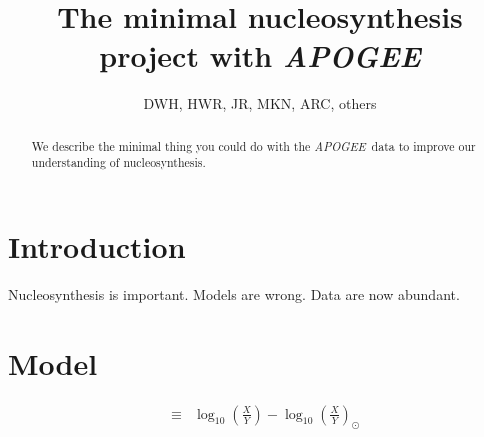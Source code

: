 \documentclass[12pt, preprint]{aastex}
\newcommand{\acronym}[1]{{\small{#1}}}
\newcommand{\project}[1]{\textsl{#1}}
\newcommand{\apogee}{\project{\acronym{APOGEE}}}
\newcommand{\solar}{\odot}
\begin{document}
\title{The minimal nucleosynthesis project with \apogee}
\author{DWH, HWR, JR, MKN, ARC, others}

\begin{abstract}
We describe the minimal thing you could do with the \apogee\ data to
improve our understanding of nucleosynthesis.
\end{abstract}


\section{Introduction}

Nucleosynthesis is important.  Models are wrong.  Data are now abundant.

\section{Model}

\begin{eqnarray}
  [X/Y] &\equiv& \log_{10}\left(\frac{X}{Y}\right) -
                 \log_{10}\left(\frac{X}{Y}\right)_\solar
\end{eqnarray}
\end{document}
